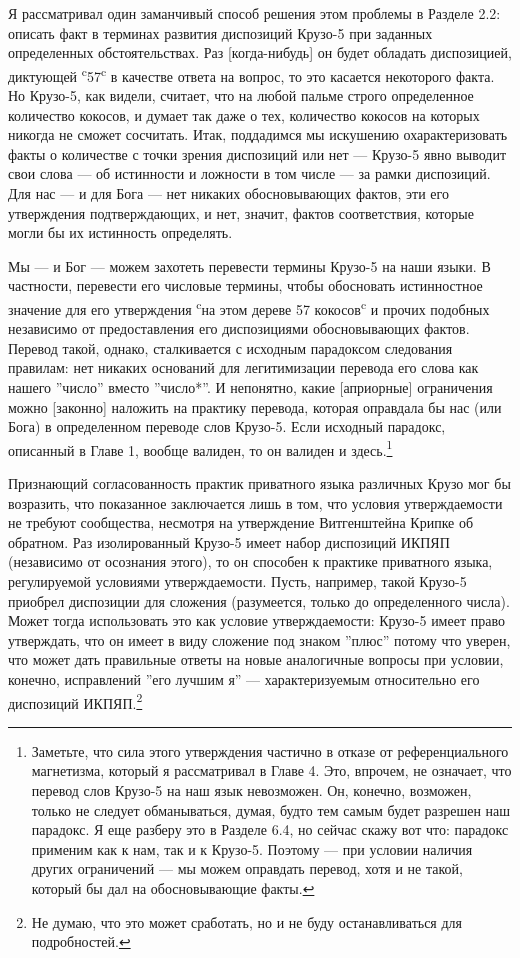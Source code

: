 \documentclass[11pt]{book}
\begin{document}
Я рассматривал один заманчивый способ решения этом проблемы в Разделе 2.2: описать факт в терминах развития диспозиций Крузо-5 при заданных определенных обстоятельствах. Раз [когда-нибудь] он будет обладать диспозицией, диктующей \textsuperscript{c}57\textsuperscript{c} в качестве ответа на вопрос, то это касается некоторого факта. Но Крузо-5, как видели, считает, что на любой пальме строго определенное количество кокосов, и думает так даже о тех, количество кокосов на которых никогда не сможет сосчитать. Итак, поддадимся мы искушению охарактеризовать факты о количестве с точки зрения диспозиций или нет --- Крузо-5 явно выводит свои слова --- об истинности и ложности в том числе --- за рамки диспозиций. Для нас --- и для Бога --- нет никаких обосновывающих фактов, эти его утверждения подтверждающих, и нет, значит, фактов соответствия, которые могли бы их истинность определять.

Мы --- и Бог --- можем захотеть перевести термины Крузо-5 на наши языки. В частности, перевести его числовые термины, чтобы обосновать истинностное значение для его утверждения \textsuperscript{c}на этом дереве 57 кокосов\textsuperscript{c} и прочих подобных независимо от предоставления его диспозициями обосновывающих фактов. Перевод такой, однако, сталкивается с исходным парадоксом следования правилам: нет никаких оснований для легитимизации перевода его слова как нашего ''число'' вместо ''число*''. И непонятно, какие [априорные] ограничения можно [законно] наложить на практику перевода, которая оправдала бы нас (или Бога) в определенном переводе слов Крузо-5. Если исходный парадокс, описанный в Главе 1, вообще валиден, то он валиден и здесь.\footnote{Заметьте, что сила этого утверждения частично в отказе от референциального магнетизма, который я рассматривал в Главе 4. Это, впрочем, не означает, что перевод слов Крузо-5 на наш язык невозможен. Он, конечно, возможен, только не следует обманываться, думая, будто тем самым будет разрешен наш парадокс. Я еще разберу это в Разделе 6.4, но сейчас скажу вот что: парадокс применим как к нам, так и к Крузо-5. Поэтому --- при условии наличия других ограничений --- мы можем оправдать перевод, хотя и не такой, который бы дал на обосновывающие факты.}

Признающий согласованность практик приватного языка различных Крузо мог бы возразить, что показанное заключается лишь в том, что условия утверждаемости не требуют сообщества, несмотря на утверждение Витгенштейна Крипке об обратном. Раз изолированный Крузо-5 имеет набор диспозиций ИКПЯП (независимо от осознания этого), то он способен к практике приватного языка, регулируемой условиями утверждаемости. Пусть, например, такой Крузо-5 приобрел диспозиции для сложения (разумеется, только до определенного числа). Может тогда использовать это как условие утверждаемости: Крузо-5 имеет право утверждать, что он имеет в виду сложение под знаком ''плюс'' потому что уверен, что может дать правильные ответы на новые аналогичные вопросы при условии, конечно, исправлений ''его лучшим я'' --- характеризуемым относительно его диспозиций ИКПЯП.\footnote{Не думаю, что это может сработать, но и не буду останавливаться для подробностей.}
\end{document}
